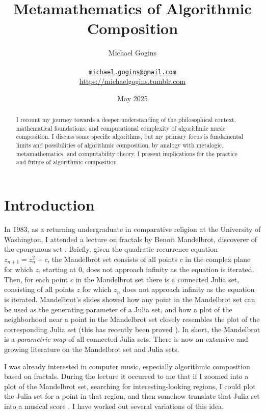 \documentclass[11pt,papersize=a4]{scrartcl}
\begin{document}
\title{Metamathematics of Algorithmic Composition}
\author{Michael Gogins \\ \\ \texttt{\href{mailto:michael.gogins@gmail.com}{michael.gogins@gmail.com}}  \\ \url{https://michaelgogins.tumblr.com}}
\date{May 2025}
\maketitle
\begin{abstract}
I recount my journey towards a deeper understanding of the philosophical context, mathematical foundations, and computational complexity of algorithmic music composition. I discuss some specific algorithms, but my primary focus is fundamental limits and possibilities of algorithmic composition, by analogy with metalogic, metamathematics, and computability theory. I present implications for the practice and future of algorithmic composition. 
\end{abstract}

\section*{Introduction}

In 1983, as a returning undergraduate in comparative religion at the University of Washington, I attended a lecture on fractals by Benoit Mandelbrot, discoverer of the eponymous set \parencite{citeulike:580392, peitgen2004mandelbrot}. Briefly, given the quadratic recurrence equation $z_{n+1} = z_n^2 + c$, the Mandelbrot set consists of all points $c$ in the complex plane for which $z$, starting at 0, does not approach infinity as the equation is iterated. Then, for each point $c$ in the Mandelbrot set there is a connected Julia set, consisting of all points $z$ for which $z_n$ does not approach infinity as the equation is iterated. Mandelbrot's slides showed how any point in the Mandelbrot set can be used as the generating parameter of a Julia set, and how a plot of the neighborhood near a point in the Mandelbrot set closely resembles the plot of the corresponding Julia set \parencite{lei1990similarity} (this has recently been proved \parencite{kawahira2018julia}). In short, the Mandelbrot is a \emph{parametric map} of all connected Julia sets. There is now an extensive and growing literature on the Mandelbrot set and Julia sets. 

I was already interested in computer music, especially algorithmic composition based on fractals. During the lecture it occurred to me that if I zoomed into a plot of the Mandelbrot set, searching for interesting-looking regions, I could plot the Julia set for a point in that region, and then somehow translate that Julia set into a musical score \parencite{obsessed}. I have worked out several variations of this idea.
\end{document}
